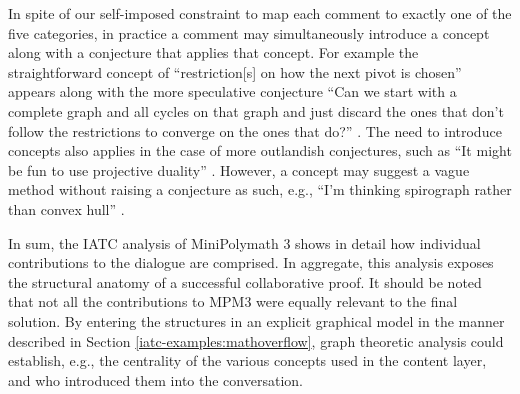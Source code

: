 \documentclass[smallextended,oneside]{svjour3}       %
\let\cite\citep
\newcommand\nothing[1]{#1}
\let\paragraph\nothing
\begin{document}
\paragraph{In spite of our self-imposed constraint to map each comment to exactly one of the five categories, in practice a comment may simultaneously introduce a concept along with a conjecture that applies that concept.}
For example the straightforward concept of
``restriction[s] on how the next pivot is chosen''
appears along with the more speculative conjecture  ``Can we
start with a complete graph and all cycles on that graph and just
discard the ones that don't follow the restrictions to converge on the
ones that do?''
\cite[\href{https://wp.me/pAG2F-41\#comment-3368}{July 19, 8:56 pm}]{tao2011imo}.
The need to introduce concepts also applies in the case of more outlandish conjectures,
such as
``It might be fun to use projective duality''
\cite[\href{https://wp.me/pAG2F-41\#comment-3324}{July 19, 8:23 pm}]{tao2011imo}.
However, a concept may suggest a vague method
without raising a conjecture as such,
e.g., ``I'm thinking spirograph rather than convex hull''
\cite[\href{https://wp.me/pAG2F-41\#comment-3349}{July 19, 8:44 pm}]{tao2011imo}.

\paragraph{In sum, the IATC analysis of MiniPolymath 3 shows in detail how individual contributions to the dialogue are comprised.}
In aggregate, this analysis exposes the structural anatomy of a successful collaborative proof.
It should be noted that not all the contributions to MPM3 were equally relevant to the final solution.   By entering the structures in an explicit graphical model in the manner described in Section \ref{iatc-examples:mathoverflow}, graph theoretic analysis could establish, e.g., the centrality of the various concepts used in the content layer, and who introduced them into the conversation.  

\FloatBarrier
\end{document}
